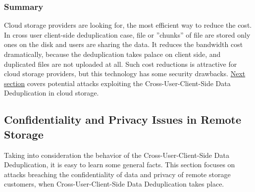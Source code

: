 \documentclass[12pt]{article}
\begin{document}
\subsubsection{Summary}
\label{subsub:SummaryDedup}
Cloud storage providers are looking for, the most efficient way to reduce the cost. In cross user client-side deduplication  case, file or ”chunks” of file are stored only ones on the disk and users are sharing the data. It reduces the bandwidth cost dramatically, because the deduplication takes palace on client side, and duplicated files are not uploaded at all.\cite{DeDupDropBox} Such cost reductions is attractive for cloud storage providers, but this technology has some security drawbacks. \hyperref[sub:ConfidentialityAndPrivacy]{Next section} covers potential attacks exploiting the Cross-User-Client-Side Data Deduplication in cloud storage.


\subsection{Confidentiality and Privacy Issues in Remote Storage}
\label{sub:ConfidentialityAndPrivacy}
Taking into consideration the behavior of the Cross-User-Client-Side Data Deduplication, it is easy to learn some general facts. This section focuses on attacks breaching the confidentiality of data and privacy of remote storage customers, when Cross-User-Client-Side Data Deduplication takes place.
\end{document}
